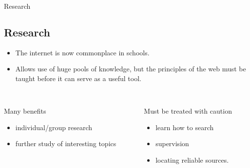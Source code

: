 \documentclass{beamer}
\begin{document}
\begin{frame}{Research}
    \subsection{Research}
    \begin{itemize}
        \item The internet is now commonplace in schools.
        \item Allows use of huge pools of knowledge, but the principles of the web must be taught before it can serve as a useful tool.\\~\\
    \end{itemize}
    \begin{columns}
           \begin{column}[l]{5cm}
            Many benefits
            \begin{itemize}
                \item individual/group research
                \item further study of interesting topics
            \end{itemize}
        \end{column}
        \begin{column}[r]{5cm}
            Must be treated with caution
            \begin{itemize}
                \item learn how to search
                \item supervision
                \item locating reliable sources.
            \end{itemize}
        \end{column}
    \end{columns}
\end{frame}
\end{document}
